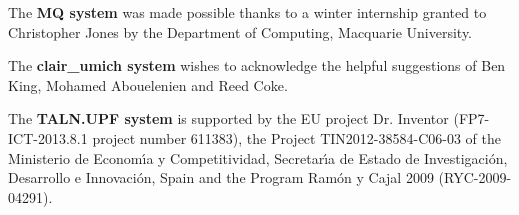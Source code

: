 \documentclass[11pt]{article}
\begin{document}
The {\bf MQ system} was made possible thanks to a winter internship
granted to Christopher Jones by the Department of Computing, Macquarie
University.

The {\bf clair\_umich system} wishes to acknowledge the helpful
suggestions of Ben King, Mohamed Abouelenien and Reed Coke.

The {\bf TALN.UPF system} is supported by the EU project Dr. Inventor
(FP7-ICT-2013.8.1 project number 611383), the Project
TIN2012-38584-C06-03 of the Ministerio de Econom\'{\i}a y
Competitividad, Secretar\'{\i}a de Estado de Investigaci\'on,
Desarrollo e Innovaci\'on, Spain and the Program Ram\'on y Cajal 2009
(RYC-2009-04291).


\end{document}
